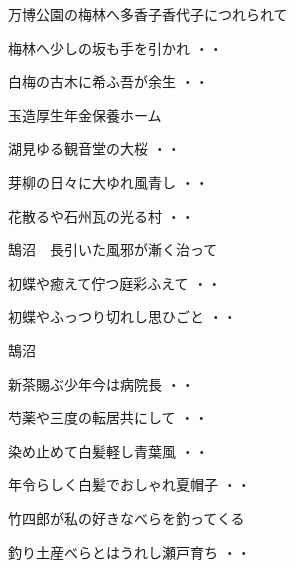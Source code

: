 \vspace{0.6cm}
万博公園の梅林へ多香子香代子につれられて
\begin{shiika}梅林へ少しの坂も手を引かれ
\hfill{・・}\end{shiika}
\begin{shiika}白梅の古木に希ふ吾が余生
\hfill{・・}\end{shiika}
\vspace{0.6cm}
玉造厚生年金保養ホーム
\begin{shiika}湖見ゆる観音堂の大桜
\hfill{・・}\end{shiika}
\begin{shiika}芽柳の日々に大ゆれ風青し
\hfill{・・}\end{shiika}
\begin{shiika}花散るや石州瓦の光る村
\hfill{・・}\end{shiika}
\vspace{0.6cm}
鵠沼　長引いた風邪が漸く治って
\begin{shiika}初蝶や癒えて佇つ庭彩ふえて
\hfill{・・}\end{shiika}
\begin{shiika}初蝶やふっつり切れし思ひごと
\hfill{・・}\end{shiika}
\vspace{0.6cm}
鵠沼
\begin{shiika}新茶賜ぶ少年今は病院長
\hfill{・・}\end{shiika}
\begin{shiika}芍薬や三度の転居共にして
\hfill{・・}\end{shiika}
\vspace{0.6cm}
\begin{shiika}染め止めて白髪軽し青葉風
\hfill{・・}\end{shiika}
\vspace{0.6cm}
\begin{shiika}年令らしく白髪でおしゃれ夏帽子
\hfill{・・}\end{shiika}
\vspace{0.6cm}
竹四郎が私の好きなべらを釣ってくる
\begin{shiika}釣り土産べらとはうれし瀬戸育ち
\hfill{・・}\end{shiika}
